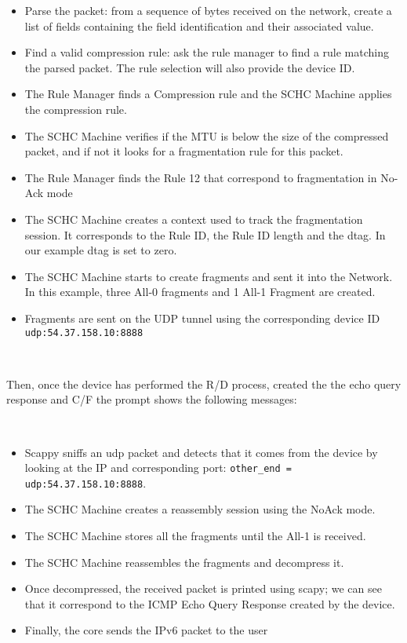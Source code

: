 \documentclass[onecolumn,12pt]{book}
\newcounter{c}
\begin{document}
\begin{itemize}

\item Parse the packet: from a sequence of bytes received on the network, create a list of fields containing the field identification and their associated value.
\item Find a valid compression rule: ask the rule manager to find a rule matching the
parsed packet. 
The rule selection will also provide the device ID.
\item The Rule Manager finds a Compression rule and the SCHC Machine applies the compression rule.
\item The SCHC Machine verifies if the MTU is below the size of the compressed packet, and if not it looks for a fragmentation rule for this packet. 
\item The Rule Manager finds the Rule 12 that correspond to fragmentation in No-Ack mode
\item The SCHC Machine creates a context used to track the fragmentation session. It corresponds to the Rule ID, the Rule ID length and the dtag. In our example dtag is set to zero.
\item The SCHC Machine starts to create fragments and sent it into the Network. 
In this example, three All-0 fragments and 1 All-1 Fragment are created.
\item Fragments are sent on the UDP tunnel using the corresponding device ID 
\\
\texttt{udp:54.37.158.10:8888}
\end{itemize}

~

Then, once the device has performed the R/D process, created the the echo query response and C/F the prompt shows the following messages:

~

\begin{itemize}
\item Scappy sniffs an udp packet and detects that it comes from the device by looking at the IP and corresponding port: \texttt{other\_end = udp:54.37.158.10:8888}.
\item The SCHC Machine creates a reassembly session using the NoAck mode.
\item The SCHC Machine stores all the fragments until the All-1 is received.
\item The SCHC Machine reassembles the fragments and decompress it.
\item Once decompressed, the received packet is printed using scapy; we can see that it correspond to the ICMP Echo Query Response created by the device.
\item Finally, the core sends the IPv6 packet to the user  
\end{itemize}
\end{document}
